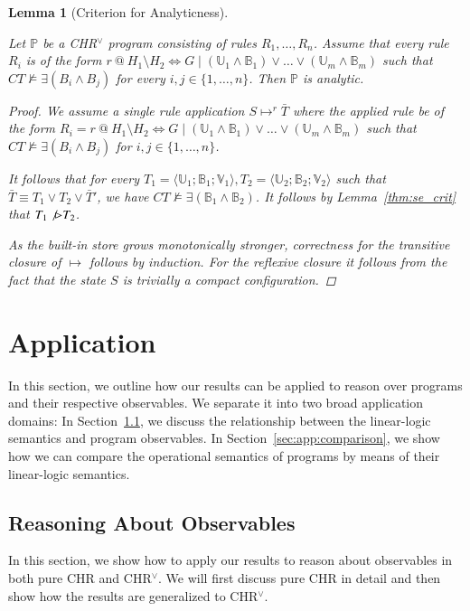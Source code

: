 \documentclass[acmtocl]{acmtrans2m}
\newtheorem{lemma}[theorem]{Lemma}
\newcommand\state[1]{\langle #1 \rangle}
\newcommand\ent{\rhd}
\newcommand{\bbP}{\ensuremath{\mathbb{P}}}
\newcommand{\B}{\ensuremath{\mathbb{B}}}
\newcommand{\U}{\ensuremath{\mathbb{U}}}
\newcommand{\V}{\ensuremath{\mathbb{V}}}
\newcommand{\bT}{\bar{T}}
\newcommand\inintv[2]{\ensuremath{#1\in\{1,\ldots,#2\}}}
\begin{document}
\begin{lemma}[Criterion for Analyticness]
\label{lemma:vee-analytic-criterion}

Let $\bbP$ be a CHR$^\vee$ program consisting of rules $R_1,\ldots,R_n$. Assume
that every rule $R_i$ is of the form $r\ @\ H_1\setminus H_2\Leftrightarrow G
\mid (\U_{1}\wedge\B_{1})\vee\ldots\vee(\U_m\wedge\B_m)$ such that
$CT\not\models\exists(B_i\wedge B_j)$ for every $\inintv{i,j}{n}$. Then $\bbP$
is analytic.

\begin{proof} We assume a single rule application $S\mapsto^r\bT$ where the
applied rule be of the form $R_i = r\ @\ H_1\setminus H_2\Leftrightarrow G \mid
(\U_1\wedge\B_1)\vee\ldots\vee(\U_m\wedge\B_m)$ such that
$CT\not\models\exists(B_i\wedge B_j)$ for $\inintv{i,j}{n}$.

It follows that for every
$T_1=\state{\U_1;\B_1;\V_1},T_2=\state{\U_2;\B_2;\V_2}$ such that $\bT\equiv
T_1\vee T_2\vee \bT'$, we have $CT\not\models\exists(\B_1\wedge \B_2)$. It
follows by Lemma~\ref{thm:se_crit} that $T_1\not\ent T_2$.

As the built-in store grows monotonically stronger, correctness for the
transitive closure of $\mapsto$ follows by induction. For the reflexive closure
it follows from the fact that the state $S$ is trivially a compact
configuration.
\end{proof}
\end{lemma}

\section{Application}
\label{sec:application}

In this section, we outline how our results can be applied to reason over
programs and their respective observables. We separate it into two broad
application domains: In Section~\ref{sec:app:observables}, we discuss the
relationship between the linear-logic semantics and program observables. In
Section~\ref{sec:app:comparison}, we show how we can compare the operational
semantics of programs by means of their linear-logic semantics.

\subsection{Reasoning About Observables}
\label{sec:app:observables}

In this section, we show how to apply our results to reason about observables
in both pure CHR and CHR$^\vee$. We will first discuss pure CHR in detail and
then show how the results are generalized to CHR$^\vee$.
\end{document}
